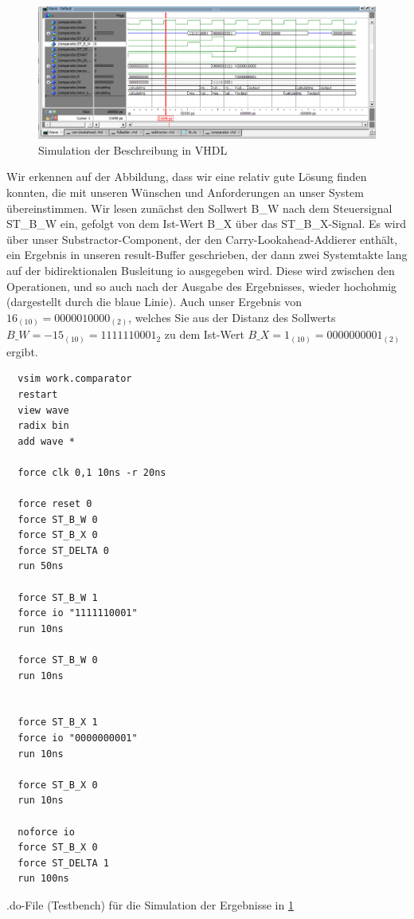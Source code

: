 \documentclass{report}
\newenvironment{longlisting}{\captionsetup{type=listing}}{}
\begin{document}
\begin{figure}[h]
  \centering
  \includegraphics[width=\textwidth]{../assets/images/DIHA/simuB.png}
  \caption{Simulation der Beschreibung in VHDL}
  \label{fig:simuB}
\end{figure}

\noindent
Wir erkennen auf der Abbildung, dass wir eine relativ gute Lösung finden konnten, die mit unseren Wünschen und Anforderungen an unser System übereinstimmen. Wir lesen zunächst den Sollwert B\_W nach dem Steuersignal ST\_B\_W ein, gefolgt von dem Ist-Wert B\_X über das ST\_B\_X-Signal. Es wird über unser Substractor-Component, der den Carry-Lookahead-Addierer enthält, ein Ergebnis in unseren result-Buffer geschrieben, der dann zwei Systemtakte lang auf der bidirektionalen Busleitung io ausgegeben wird. Diese wird zwischen den Operationen, und so auch nach der Ausgabe des Ergebnisses, wieder hochohmig (dargestellt durch die blaue Linie). Auch unser Ergebnis von $16_{(10)} = 0000010000_{(2)}$, welches Sie aus der Distanz des Sollwerts $B\_W = -15_{(10)} = 1111110001_{2}$ zu dem Ist-Wert $B\_X = 1_{(10)} = 0000000001_{(2)}$ ergibt.

\newpage 

\begin{longlisting}
  \begin{verbatim}
  vsim work.comparator
  restart
  view wave
  radix bin
  add wave *

  force clk 0,1 10ns -r 20ns

  force reset 0
  force ST_B_W 0
  force ST_B_X 0
  force ST_DELTA 0
  run 50ns

  force ST_B_W 1
  force io "1111110001"
  run 10ns

  force ST_B_W 0
  run 10ns


  force ST_B_X 1
  force io "0000000001"
  run 10ns

  force ST_B_X 0
  run 10ns

  noforce io
  force ST_B_X 0
  force ST_DELTA 1
  run 100ns
  \end{verbatim}
  \caption{.do-File (Testbench) für die Simulation der Ergebnisse in \ref{fig:simuB}}
  \label{code:doB}
\end{longlisting}
\end{document}
